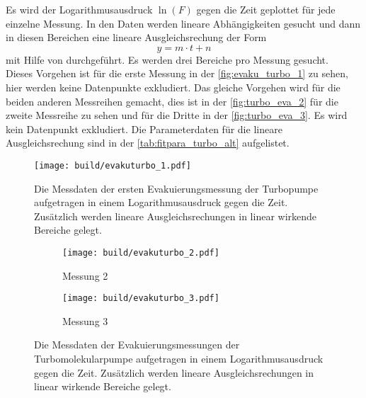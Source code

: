    \noindent Es wird der Logarithmusausdruck $\ln(F)$ gegen die Zeit geplottet für jede einzelne Messung. In den Daten werden lineare Abhängigkeiten gesucht und dann in diesen Bereichen
    eine lineare Ausgleichsrechung der Form 
    \begin{equation*}
      y = m \cdot t + n
    \end{equation*}
    mit Hilfe von \cite{scipy} durchgeführt. Es werden drei Bereiche pro Messung gesucht. \\
    Dieses Vorgehen ist für die erste Messung in der \autoref{fig:evaku_turbo_1} zu sehen, hier werden keine Datenpunkte exkludiert. Das gleiche Vorgehen wird für
    die beiden anderen Messreihen gemacht, dies ist in der \autoref{fig:turbo_eva_2} für die zweite Messreihe zu sehen und für die Dritte in der \autoref{fig:turbo_eva_3}. 
    Es wird kein Datenpunkt exkludiert. 
    Die Parameterdaten für die lineare Ausgleichsrechung sind in der \autoref{tab:fitpara_turbo_alt} aufgelistet. \\ 
    

    \begin{figure}[h]
      \centering
      \texttt{[image: build/evakuturbo\_1.pdf]}
      \caption{Die Messdaten der ersten Evakuierungsmessung der Turbopumpe aufgetragen in einem Logarithmusausdruck gegen die Zeit. Zusätzlich werden lineare Ausgleichsrechungen in linear wirkende Bereiche gelegt.}
      \label{fig:evaku_turbo_1}
    \end{figure}

    \begin{figure}[h]
      \begin{subfigure}{0.48\textwidth}
        \centering
        \texttt{[image: build/evakuturbo\_2.pdf]}
        \caption{Messung 2}
        \label{fig:turbo_eva_2}
      \end{subfigure}
      \hfill
      \begin{subfigure}{0.48\textwidth}
        \centering
        \texttt{[image: build/evakuturbo\_3.pdf]}
        \caption{Messung 3}
        \label{fig:turbo_eva_3}
      \end{subfigure}
      \caption{Die Messdaten der Evakuierungsmessungen der Turbomolekularpumpe aufgetragen in einem Logarithmusausdruck gegen die Zeit. 
      Zusätzlich werden lineare Ausgleichsrechungen in linear wirkende Bereiche gelegt.}
      \label{fig:turbo_eva_2_3}
    \end{figure}


